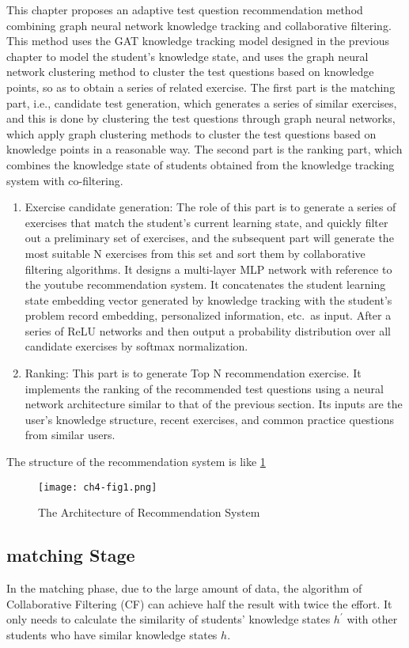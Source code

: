 This chapter proposes an adaptive test question recommendation method combining graph neural network knowledge tracking and collaborative filtering. This method uses the GAT knowledge tracking model designed in the previous chapter to model the student’s knowledge state, and uses the graph neural network clustering method to cluster the test questions based on knowledge points, so as to obtain a series of related exercise. The first part is the matching part, i.e., candidate test generation, which generates a series of similar exercises, and this is done by clustering the test questions through graph neural networks, which apply graph clustering methods to cluster the test questions based on knowledge points in a reasonable way. The second part is the ranking part, which combines the knowledge state of students obtained from the knowledge tracking system with co-filtering.
\begin{enumerate}
  \item Exercise candidate generation: The role of this part is to generate a series of exercises that match the student's current learning state, and quickly filter out a preliminary set of exercises, and the subsequent part will generate the most suitable N exercises from this set and sort them by collaborative filtering algorithms. It designs a multi-layer MLP network with reference to the youtube recommendation system. It concatenates the student learning state embedding vector generated by knowledge tracking with the student's problem record embedding, personalized information, etc.\ as input. After a series of ReLU networks and then output a probability distribution over all candidate exercises by softmax normalization.
  \item Ranking: This part is to generate Top N recommendation exercise. It implements the ranking of the recommended test questions using a neural network architecture similar to that of the previous section. Its inputs are the user's knowledge structure, recent exercises, and common practice questions from similar users.
\end{enumerate}

The structure of the recommendation system is like \figurename{\ref{fig:ch4-fig0}}

\begin{figure}[h]
  \centering
  \texttt{[image: ch4-fig1.png]}
  \caption{The Architecture of Recommendation System}\label{fig:ch4-fig0}
\end{figure}

\subsection{matching Stage}
In the matching phase, due to the large amount of data, the algorithm of Collaborative Filtering (CF)\cite{salakhutdinov2007restricted} can achieve half the result with twice the effort. It only needs to calculate the similarity of students' knowledge states \(h^\prime \) with other students who have similar knowledge states \(h\).

